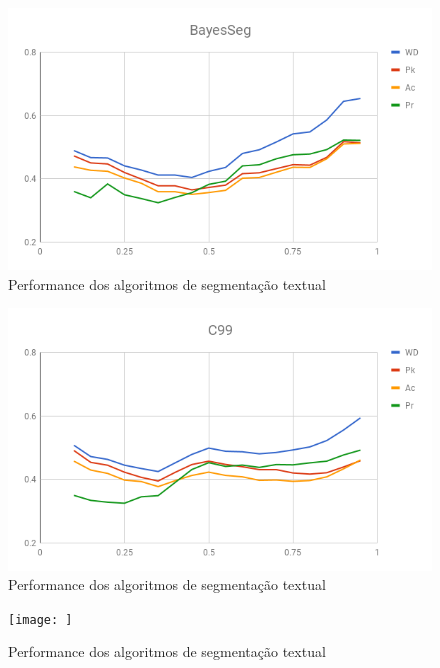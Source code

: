   \begin{figure}[!h]
	  \centering
	  \includegraphics[width=1\textwidth]{conteudo/capitulos/figs/graficos/analiseNSegRate-Bayes.png}
	  \caption{Performance dos algoritmos de segmentação textual}
	  \label{fig:grafico-medidas-tradicionais}
  \end{figure}

  
  \begin{figure}[!h]
	  \centering
	  \includegraphics[width=1\textwidth]{conteudo/capitulos/figs/graficos/analiseNSegRate-C99.png}
	  \caption{Performance dos algoritmos de segmentação textual}
	  \label{fig:grafico-medidas-tradicionais}
  \end{figure}


  
  \begin{figure}[!h]
	  \centering
	  \texttt{[image: ]}
	  \caption{Performance dos algoritmos de segmentação textual}
	  \label{fig:grafico-medidas-tradicionais}
  \end{figure}



